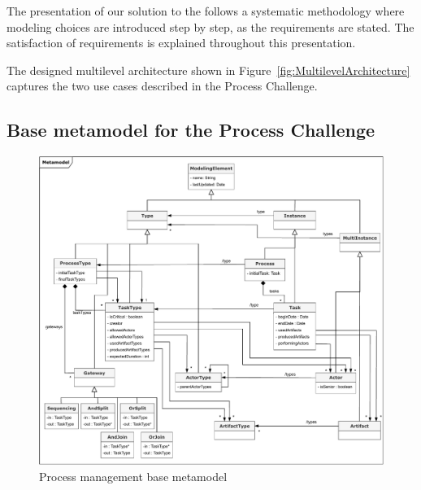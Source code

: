 
The presentation of our solution to the \mpc follows a systematic methodology where modeling choices are introduced step by step, as the requirements are stated. The satisfaction of requirements is explained throughout this presentation.


The designed multilevel architecture shown in Figure~\ref{fig:MultilevelArchitecture} captures the two use cases described in the Process Challenge.


\subsection{Base metamodel for the Process Challenge}

\begin{figure}
 \centering
    \includegraphics[width=1.0 \textwidth]{Figures/Metamodel.pdf}
     \caption{Process management base metamodel}
    \label{fig:BaseMetamodel}
\end{figure}

